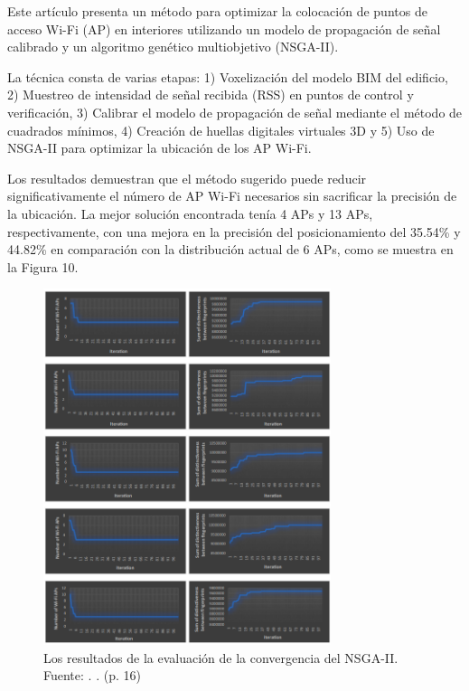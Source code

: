 Este artículo presenta un método para optimizar la colocación de puntos de acceso Wi-Fi (AP) en interiores utilizando un modelo de propagación de señal calibrado y un algoritmo genético multiobjetivo (NSGA-II).

La técnica consta de varias etapas: 1) Voxelización del modelo BIM del edificio, 2) Muestreo de intensidad de señal recibida (RSS) en puntos de control y verificación, 3) Calibrar el modelo de propagación de señal mediante el método de cuadrados mínimos, 4) Creación de huellas digitales virtuales 3D y 5) Uso de NSGA-II para optimizar la ubicación de los AP Wi-Fi. 

Los resultados demuestran que el método sugerido puede reducir significativamente el número de AP Wi-Fi necesarios sin sacrificar la precisión de la ubicación. La mejor solución encontrada tenía 4 APs y 13 APs, respectivamente, con una mejora en la precisión del posicionamiento del 35.54\% y 44.82\% en comparación con la distribución actual de 6 APs, como se muestra en la Figura 10.

\begin{figure}[!ht]
	\begin{center}
		\includegraphics[width=0.75\textwidth]{2/figures/hosseini2023.png}
		\caption[Los resultados de la evaluación de la convergencia del NSGA-II]{Los resultados de la evaluación de la convergencia del NSGA-II.\\
		Fuente: \cite{pr_hosseini2023NSGAIIap}. . (p. 16)}
		\label{2:fig118}
	\end{center}
\end{figure}

